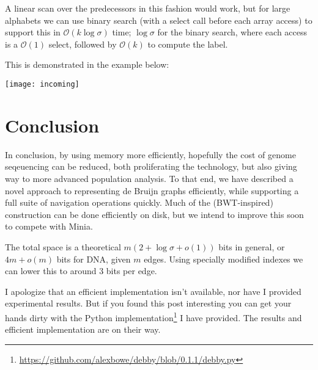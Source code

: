 A linear scan over the predecessors in this fashion would work, but for large alphabets we can use binary search (with a select call before each array access) to support this in $\mathcal{O}(k\log\sigma)$ time; $\log\sigma$ for the binary search, where each access is a $\mathcal{O}(1)$ select, followed by $\mathcal{O}(k)$ to compute the label.

This is demonstrated in the example below:

\medskip\centerline{\texttt{[image: incoming]}}\medskip

\section{Conclusion}\label{bl-sec:conc}

In conclusion, by using memory more efficiently, hopefully the cost of genome seqeuencing can be reduced, both proliferating the technology, but also giving way to more advanced population analysis. To that end, we have described a novel approach to representing de Bruijn graphs efficiently, while supporting a full suite of navigation operations quickly. Much of the (BWT-inspired) construction can be done efficiently on disk, but we intend to improve this soon to compete with Minia.

The total space is a theoretical $m(2 + \log{\sigma} + o(1))$ bits in general, or $4m + o(m)$ bits for DNA, given $m$ edges. Using specially modified indexes we can lower this to around 3 bits per edge.

I apologize that an efficient implementation isn't available, nor have I provided experimental results. But if you found this post interesting you can get your hands dirty with the Python implementation\footnote{\url{https://github.com/alexbowe/debby/blob/0.1.1/debby.py}} I have provided. The results and efficient implementation are on their way.

